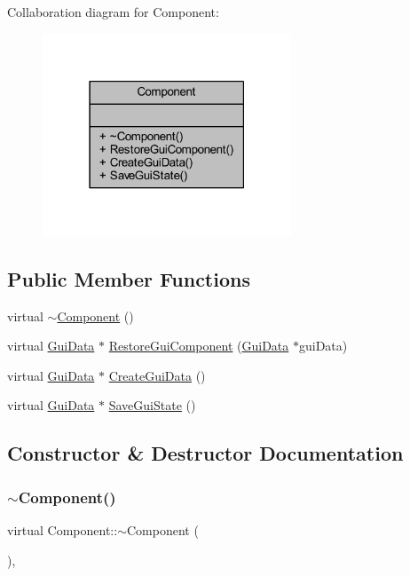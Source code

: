 Collaboration diagram for Component\+:
\nopagebreak
\begin{figure}[H]
\begin{center}
\leavevmode
\includegraphics[width=210pt]{class_component__coll__graph}
\end{center}
\end{figure}
\subsection*{Public Member Functions}
\begin{DoxyCompactItemize}
\item 
virtual \mbox{\hyperlink{class_component_a2e9aa4348314d981f05f67397ad2f872}{$\sim$\+Component}} ()
\item 
virtual \mbox{\hyperlink{class_gui_data}{Gui\+Data}} $\ast$ \mbox{\hyperlink{class_component_a0a1e8b4aaa523ad8b6460ff35dd6c584}{Restore\+Gui\+Component}} (\mbox{\hyperlink{class_gui_data}{Gui\+Data}} $\ast$gui\+Data)
\item 
virtual \mbox{\hyperlink{class_gui_data}{Gui\+Data}} $\ast$ \mbox{\hyperlink{class_component_a634070ac3118a22828bd3c130f27cf2a}{Create\+Gui\+Data}} ()
\item 
virtual \mbox{\hyperlink{class_gui_data}{Gui\+Data}} $\ast$ \mbox{\hyperlink{class_component_a2d6c81535df008c6788ba21d0812ed44}{Save\+Gui\+State}} ()
\end{DoxyCompactItemize}


\subsection{Constructor \& Destructor Documentation}
\mbox{\label{class_component_a2e9aa4348314d981f05f67397ad2f872}} 
\subsubsection{\texorpdfstring{$\sim$Component()}{~Component()}}
{\footnotesize\ttfamily virtual Component\+::$\sim$\+Component (\begin{DoxyParamCaption}{ }\end{DoxyParamCaption})\hspace{0.3cm}{\ttfamily [inline]}, {\ttfamily [virtual]}}



